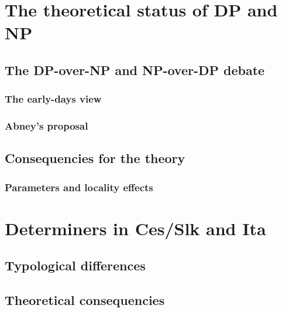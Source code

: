 \documentclass[
  a4paper,
  twoside,
  12pt,
  chapterprefix=false,
  bibliography=totocnumbered,
  listof=flat]{scrbook}
\begin{document}
\hypertarget{the-theoretical-status-of-dp-and-np}{%
\section{The theoretical status of DP and NP}\label{the-theoretical-status-of-dp-and-np}}

\hypertarget{the-dp-over-np-and-np-over-dp-debate}{%
\subsection{The DP-over-NP and NP-over-DP debate}\label{the-dp-over-np-and-np-over-dp-debate}}

\hypertarget{the-early-days-view}{%
\subsubsection{The early-days view}\label{the-early-days-view}}

\hypertarget{abneys-proposal}{%
\subsubsection{Abney's proposal}\label{abneys-proposal}}

\hypertarget{consequencies-for-the-theory}{%
\subsection{Consequencies for the theory}\label{consequencies-for-the-theory}}

\hypertarget{parameters-and-locality-effects}{%
\subsubsection{Parameters and locality effects}\label{parameters-and-locality-effects}}

\hypertarget{determiners-in-cesslk-and-ita}{%
\section{Determiners in Ces/Slk and Ita}\label{determiners-in-cesslk-and-ita}}

\hypertarget{typological-differences}{%
\subsection{Typological differences}\label{typological-differences}}

\hypertarget{theoretical-consequencies}{%
\subsection{Theoretical consequencies}\label{theoretical-consequencies}}
\end{document}
